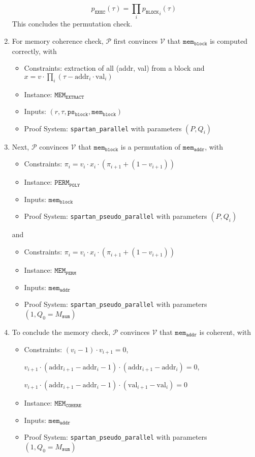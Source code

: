 \documentclass{article}
\newcommand{\code}{\texttt}
\newcommand{\Msum}{M_{\mathtt{sum}}}
\renewcommand{\P}{\mathcal{P}}
\newcommand{\V}{\mathcal{V}}
\newcommand{\MEME}{\mathtt{MEM_{EXTRACT}}}
\newcommand{\MEMC}{\mathtt{MEM_{COHERE}}}
\newcommand{\psb}{\mathtt{ps_{block}}}
\newcommand{\memb}{\mathtt{mem_{block}}}
\newcommand{\mema}{\mathtt{mem_{addr}}}
\newcommand{\addr}{\mbox{addr}}
\newcommand{\val}{\mbox{val}}
\begin{document}
\begin{enumerate}
    $$p_\mathtt{EXEC}(\tau) = \prod_i {p_\mathtt{BLOCK}}_i(\tau)$$
    This concludes the permutation check.
    \item For memory coherence check, $\P$ first convinces $\V$ that $\memb$ is computed correctly, with
    \begin{itemize}
        \item Constraints: extraction of all (addr, val) from a block and $x = v\cdot \prod_i (\tau - \addr_i \cdot \val_i)$
        \item Instance: $\MEME$
        \item Inputs: $(r, \tau, \psb, \memb)$
        \item Proof System: \code{spartan\_parallel} with parameters $(P, Q_i)$
    \end{itemize}
    \item Next, $\P$ convinces $\V$ that $\memb$ is a permutation of $\mema$, with
    \begin{itemize}
        \item Constraints: $\pi_i = v_i \cdot x_i \cdot (\pi_{i+1} + (1 - v_{i+1}))$
        \item Instance: $\mathtt{PERM}_\mathtt{POLY}$
        \item Inputs: $\memb$
        \item Proof System: \code{spartan\_pseudo\_parallel} with parameters $(P, Q_i)$
    \end{itemize}
    and
    \begin{itemize}
        \item Constraints: $\pi_i = v_i \cdot x_i \cdot (\pi_{i+1} + (1 - v_{i+1}))$
        \item Instance: $\mathtt{MEM}_\mathtt{PERM}$
        \item Inputs: $\mema$
        \item Proof System: \code{spartan\_pseudo\_parallel} with parameters $(1, Q_0 = \Msum)$
    \end{itemize}
    \item To conclude the memory check, $\P$ convinces $\V$ that $\mema$ is coherent, with
    \begin{itemize}
        \item Constraints: $(v_i - 1) \cdot v_{i+1} = 0$,
        
        $v_{i + 1} \cdot (\addr_{i + 1} - \addr_i - 1) \cdot (\addr_{i + 1} - \addr_i) = 0$,
        
        $v_{i + 1} \cdot (\addr_{i + 1} - \addr_i - 1) \cdot (\val_{i + 1} - \val_i) = 0$
        \item Instance: $\MEMC$
        \item Inputs: $\mema$
        \item Proof System: \code{spartan\_pseudo\_parallel} with parameters $(1, Q_0 = \Msum)$
    \end{itemize}


\end{enumerate}
\end{document}
